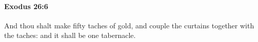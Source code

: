 
		\paragraph{Exodus 26:6} %
			\label{EXODUS-26-6}

			And thou shalt make fifty taches of gold, and couple the curtains together with the taches: and it shall be one tabernacle.


